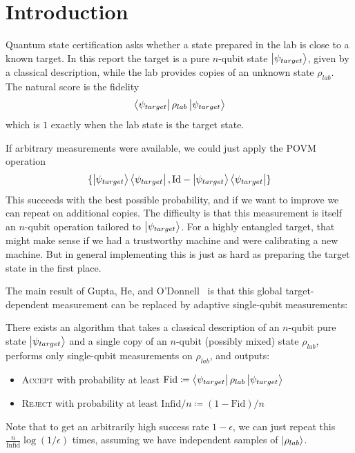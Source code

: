 \section{Introduction}\label{sec:intro}
Quantum state certification asks whether a state prepared in the lab is close to a known target. In this report the target is a pure $n$-qubit state $\ket{\psi_{target}}$, given by a classical description, while the lab provides copies of an unknown state $\rho_{lab}$. The natural score is the fidelity
\[
    \bra{\psi_{target}}\rho_{lab}\ket{\psi_{target}}
\]
which is $1$ exactly when the lab state is the target state.

If arbitrary measurements were available, we could just apply the POVM operation
\[
    \{\ket{\psi_{target}}\bra{\psi_{target}}, \mathrm{Id}-\ket{\psi_{target}}\bra{\psi_{target}}\}
\]
This succeeds with the best possible probability, and if we want to improve we can repeat on additional copies. The difficulty is that this measurement is itself an $n$-qubit operation tailored to $\ket{\psi_{target}}$. For a highly entangled target, that might make sense if we had a trustworthy machine and were calibrating a new machine. But in general implementing this is just as hard as preparing the target state in the first place.

The main result of Gupta, He, and O'Donnell~\cite{gupta2025singlequbitmeasurementssufficecertify} is that this global target-dependent measurement can be replaced by adaptive single-qubit measurements:

\begin{theorem}\label{thm:main}
    There exists an algorithm that takes a classical description of an $n$-qubit pure state $\ket{\psi_{target}}$ and a single copy of an $n$-qubit (possibly mixed) state $\rho_{lab}$, performs only single-qubit measurements on $\rho_{lab}$, and outputs:
    \begin{itemize}
        \item \textsc{Accept} with probability at least $\mathrm{Fid} \coloneqq \bra{\psi_{target}}\rho_{lab}\ket{\psi_{target}}$
        \item \textsc{Reject} with probability at least $\mathrm{Infid}/n \coloneqq (1-\mathrm{Fid})/n$
    \end{itemize}
\end{theorem}
Note that to get an arbitrarily high success rate $1 - \epsilon$, we can just repeat this $\frac n {\mathrm{Infid}} \log(1/\epsilon)$ times, assuming we have independent samples of $\ket{\rho_{lab}}$.


